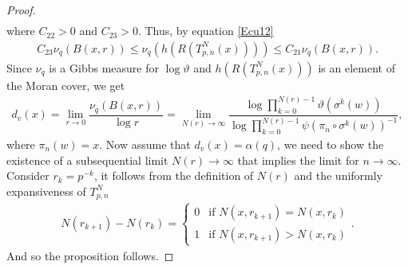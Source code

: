 \documentclass[10pt,a4paper]{amsart}
\begin{document}
\begin{proof}
\begin{align*}
\end{align*}where $C_{22}>0$ and $C_{23}>0$. Thus, by equation \eqref{Ecu12} 
\begin{align*}
    C_{23}\nu_{q}(B(x,r))\leq \nu_{q}(h(R(T^{N}_{p,n}(x)))) \leq  C_{21}\nu_{q}(B(x,r)).
\end{align*}Since $\nu_{q}$ is a Gibbs measure for $\log \vartheta$ and $h(R(T^{N}_{p,n}(x)))$ is an element of the Moran cover, we get
\begin{align*}
    d_{v}(x)=\lim_{r\to 0}\dfrac{\nu_{q}(B(x,r))}{\log r}=\lim_{N(r)\to \infty}\dfrac{\log\prod^{N(r)-1}_{k=0}\vartheta(\sigma^{k}(w))}{\log \prod^{N(r)-1}_{k=0}\psi (\pi_{n}\circ \sigma^{k}(w))^{-1}},
\end{align*}where $\pi_{n}(w)=x$. Now assume that $d_{v}(x)=\alpha(q)$, we need to show the existence of a subsequential limit $N(r)\to \infty$ that implies the limit for $n\to \infty$.  Consider $r_{k}=p^{-k}$, it follows from the definition of $N(r)$ and the uniformly expansiveness of $T^{N}_{p,n}$
\begin{align*}
    N(r_{k+1})-N(r_{k})=\begin{cases}
        0 & \text{if $N(x,r_{k+1})=N(x,r_{k})$}\\
        1 & \text{if $N(x,r_{k+1})>N(x,r_{k})$}
    \end{cases}.
\end{align*}
And so the proposition follows. %
\end{proof}
\end{document}
